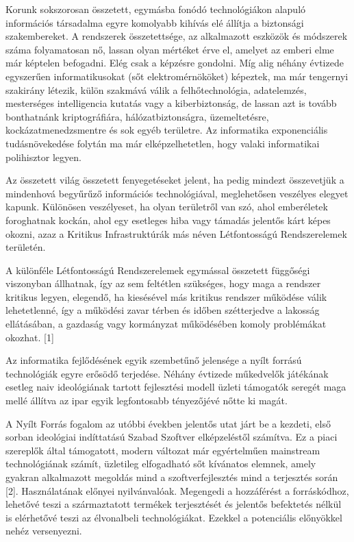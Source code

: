 \documentclass[12pt,magyar,a4paper,oneside]{scrreprt}
\begin{document}
Korunk sokszorosan összetett, egymásba fonódó technológiákon alapuló
információs társadalma egyre komolyabb kihívás elé állítja a biztonsági
szakembereket. A rendszerek összetettsége, az alkalmazott eszközök és
módszerek száma folyamatosan nő, lassan olyan mértéket érve el, amelyet
az emberi elme már képtelen befogadni. Elég csak a képzésre gondolni.
Míg alig néhány évtizede egyszerűen informatikusokat (sőt
elektromérnököket) képeztek, ma már tengernyi szakirány létezik, külön
szakmává válik a felhőtechnológia, adatelemzés, mesterséges
intelligencia kutatás vagy a kiberbiztonság, de lassan azt is tovább
bonthatnánk kriptográfiára, hálózatbiztonságra, üzemeltetésre,
kockázatmenedzsmentre és sok egyéb területre. Az informatika
exponenciális tudásnövekedése folytán ma már elképzelhetetlen, hogy
valaki informatikai polihisztor legyen.

Az összetett világ összetett fenyegetéseket jelent, ha pedig mindezt
összevetjük a mindenhová begyűrűző információs technológiával,
meglehetősen veszélyes elegyet kapunk. Különösen veszélyeset, ha olyan
területről van szó, ahol emberéletek foroghatnak kockán, ahol egy
esetleges hiba vagy támadás jelentős kárt képes okozni, azaz a Kritikus
Infrastruktúrák más néven Létfontosságú Rendszerelemek területén.

A különféle Létfontosságú Rendszerelemek egymással összetett függőségi
viszonyban állhatnak, így az sem feltétlen szükséges, hogy maga a
rendszer kritikus legyen, elegendő, ha kiesésével más kritikus rendszer
működése válik lehetetlenné, így a működési zavar térben és időben
szétterjedve a lakosság ellátásában, a gazdaság vagy kormányzat
működésében komoly problémákat okozhat. {[}1{]}

Az informatika fejlődésének egyik szembetűnő jelensége a nyílt forrású
technológiák egyre erősödő terjedése. Néhány évtizede műkedvelők
játékának esetleg naiv ideológiának tartott fejlesztési modell üzleti
támogatók seregét maga mellé állítva az ipar egyik legfontosabb
tényezőjévé nőtte ki magát.

A Nyílt Forrás fogalom az utóbbi években jelentős utat járt be a
kezdeti, első sorban ideológiai indíttatású Szabad Szoftver
elképzeléstől számítva. Ez a piaci szereplők által támogatott, modern
változat már egyértelműen mainstream technológiának számít, üzletileg
elfogadható sőt kívánatos elemnek, amely gyakran alkalmazott megoldás
mind a szoftverfejlesztés mind a terjesztés során {[}2{]}. Használatának
előnyei nyilvánvalóak. Megengedi a hozzáférést a forráskódhoz, lehetővé
teszi a származtatott termékek terjesztését és jelentős befektetés
nélkül is elérhetővé teszi az élvonalbeli technológiákat. Ezekkel a
potenciális előnyökkel nehéz versenyezni.
\end{document}
